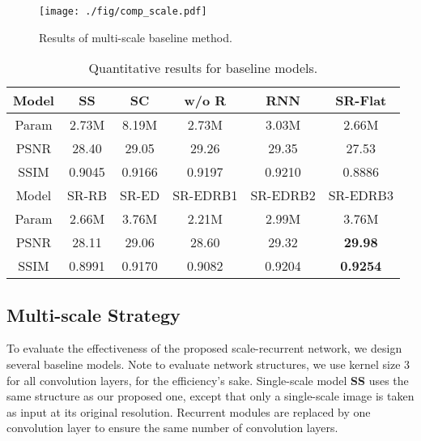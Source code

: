 \documentclass[10pt,twocolumn,letterpaper]{article}
\begin{document}
\begin{figure}[h]
  \begin{center}
\texttt{[image: ./fig/comp\_scale.pdf]}
  \end{center}
  \vspace{-0.1in}
  \caption{Results of multi-scale baseline method.}\label{fig:exp_multiscale}
  \vspace{-0.2in}
\end{figure}

\begin{table}[h]
    \center
    \caption{Quantitative results for baseline models.}\label{tab:exp}
    \vspace{0.1in}
    \setlength{\tabcolsep}{4pt}
    \footnotesize
    \begin{tabular}{c||ccccc}
       \hline
       Model & SS    & SC    & w/o R & RNN   & SR-Flat  \\ \hline
       Param & 2.73M & 8.19M & 2.73M & 3.03M & 2.66M    \\ \hline
       PSNR  & 28.40 & 29.05 & 29.26 & 29.35 & 27.53    \\ \hline
       SSIM  & 0.9045& 0.9166& 0.9197& 0.9210& 0.8886   \\ \hline
       \hline
       Model & SR-RB  & SR-ED   & SR-EDRB1 & SR-EDRB2 & SR-EDRB3\\ \hline
       Param & 2.66M  & 3.76M   & 2.21M    & 2.99M    & 3.76M   \\ \hline
       PSNR  & 28.11  & 29.06   & 28.60    & 29.32    & \textbf{29.98} \\ \hline
       SSIM  & 0.8991 & 0.9170  & 0.9082   & 0.9204   & \textbf{0.9254} \\ \hline
    \end{tabular}
    \vspace{-0.1in}
\end{table}

\subsection{Multi-scale Strategy}
To evaluate the effectiveness of the proposed scale-recurrent network, we design several baseline models. Note to evaluate network structures, we use kernel size 3 for all convolution layers, for the efficiency's sake. Single-scale model \textbf{SS} uses the same structure as our proposed one, except that only a single-scale image is taken as input at its original resolution. Recurrent modules are replaced by one convolution layer to ensure the same number of convolution layers. 
\end{document}
